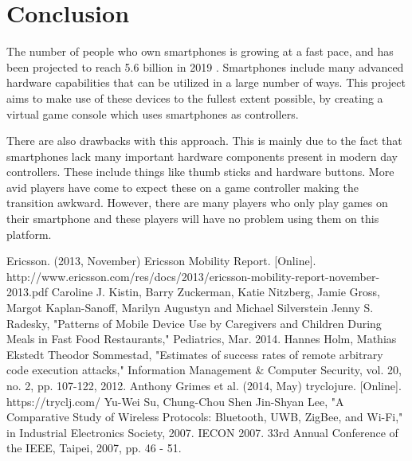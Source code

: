 \documentclass{article}
\begin{document}
\section{Conclusion}
The number of people who own smartphones is growing at a fast pace, and has been projected to
reach 5.6 billion in 2019 \cite{key:1}. Smartphones include many advanced hardware capabilities that can
be utilized in a large number of ways. This project aims to make use of these devices to the fullest extent possible, by creating a virtual game console which uses smartphones as controllers.

There are also drawbacks with this approach. This is mainly due to the fact that smartphones lack
many important hardware components present in modern day controllers. These include things
like thumb sticks and hardware buttons. More avid players have come to expect these on a game
controller making the transition awkward. However, there are many players who only play
games on their smartphone and these players will have no problem using them on this platform.

\begin{thebibliography}{9}

Ericsson. (2013, November) Ericsson Mobility Report. [Online].
http://www.ericsson.com/res/docs/2013/ericsson-mobility-report-november-2013.pdf
Caroline J. Kistin, Barry Zuckerman, Katie Nitzberg, Jamie Gross, Margot Kaplan-Sanoff,
Marilyn Augustyn and Michael Silverstein Jenny S. Radesky, "Patterns of Mobile Device
Use by Caregivers and Children During Meals in Fast Food Restaurants," Pediatrics, Mar.
2014.
 Hannes Holm, Mathias Ekstedt Theodor Sommestad, "Estimates of success rates of remote
arbitrary code execution attacks," Information Management & Computer Security, vol. 20,
no. 2, pp. 107-122, 2012.
 Anthony Grimes et al. (2014, May) tryclojure. [Online]. https://tryclj.com/
Yu-Wei Su, Chung-Chou Shen Jin-Shyan Lee, "A Comparative Study of Wireless
Protocols: Bluetooth, UWB, ZigBee, and Wi-Fi," in Industrial Electronics Society, 2007.
IECON 2007. 33rd Annual Conference of the IEEE, Taipei, 2007, pp. 46 - 51.

\end{thebibliography}
\end{document}
